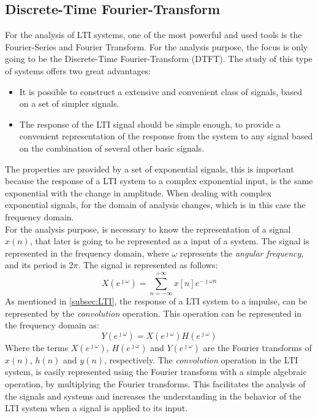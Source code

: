 \subsection{Discrete-Time Fourier-Transform}
For the analysis of LTI systems, one of the most powerful and used tools is the Fourier-Series and Fourier Transform. For the analysis purpose, the focus is only going to be the Discrete-Time Fourier-Transform (DTFT). The study of this type of systems offers two great advantages:
\begin{itemize}
    \item It is possible to construct a extensive and convenient class of signals, based on a set of simpler signals.
    \item The response of the LTI signal should be simple enough, to provide a convenient representation of the response from the system to any signal based on the combination of several other basic signals. 
\end{itemize} 
The properties are provided by a set of exponential signals, this is important because the response of a LTI system to a complex exponential input, is the same exponential with the change in amplitude. When dealing with complex exponential signals, for the domain of analysis changes, which is in this case the frequency domain. \\
For the analysis purpose, is necessary to know the representation of a signal $x(n)$, that later is going to be represented as a input of a system. The signal is represented in the frequency domain, where $\omega$ represents the \textit{angular frequency}, and its period is $2\pi$. The signal is represented as follows:
\begin{equation}
    X(e^{\jmath \omega})=\sum_{n=-\infty}^{+\infty}x[n]e^{-\jmath \omega n}
\end{equation}
As mentioned in \ref{subsec:LTI}, the response of a LTI system to a impulse, can be represented by the \textit{convolution} operation. This operation can be represented in the frequency domain as:
\begin{equation}
    Y(e^{\jmath\omega})= X(e^{\jmath\omega})H(e^{\jmath\omega})
\end{equation}
Where the terms $X(e^{\jmath\omega})$, $H(e^{\jmath\omega})$ and $Y(e^{\jmath\omega})$ are the Fourier transforms of $x(n)$, $h(n)$ and $y(n)$, respectively. The \textit{convolution} operation in the LTI system, is easily represented using the Fourier transform with a simple algebraic operation, by multiplying the Fourier transforms. This facilitates the analysis of the signals and systems and increases the understanding in the behavior of the LTI system when a signal is applied to its input. \\

